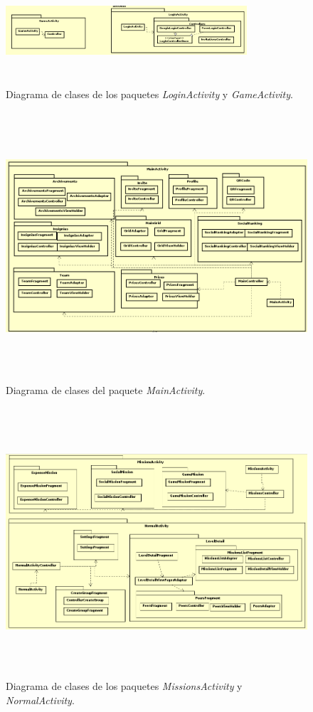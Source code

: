 \documentclass[twoside]{report}
\begin{document}
\begin{figure}[H]
\centering
\includegraphics[height=4cm,width=0.8\textwidth]{images/structureloginGameModel.PNG}
\caption{Diagrama de clases de los paquetes \textit{LoginActivity} y \textit{GameActivity}.}
\end{figure}

\begin{figure}[H]
\centering
\includegraphics[height=10cm,width=\textwidth]{images/structureMainActivity.PNG}
\caption{Diagrama de clases del paquete \textit{MainActivity}.}
\end{figure}

\begin{figure}[H]
\centering
\includegraphics[height=10cm,width=\textwidth]{images/structureMissions.PNG}
\caption{Diagrama de clases de los paquetes \textit{MissionsActivity} y \textit{NormalActivity}.}
\end{figure}
\end{document}
